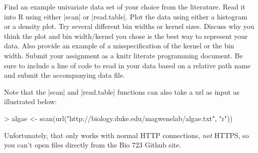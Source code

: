 








\begin{assignment}
Find an example univariate data set of your choice from the literature. Read it into R using either |scan| or |read.table|. Plot the data using either a histogram or a density plot. Try several different bin widths or kernel sizes. Discuss why you think the plot and bin width/kernel you chose is the best way to represent your data. Also provide an example of a misspecification of the kernel or the bin width. Submit your assignment as a knitr literate programming document. Be sure to include a line of code to read in your data based on a relative path name and submit the accompanying data file. 

\medskip

Note that the |scan| and |read.table| functions can also take a url as input as illustrated below:
%
\begin{tinycode}
> algae <- scan(url("http://biology.duke.edu/magwenelab/algae.txt", "r"))
\end{tinycode}
%
Unfortunately, that only works with normal HTTP connections, \emph{not} HTTPS, so you can't open files directly from the Bio 723 Github site.


\end{assignment}